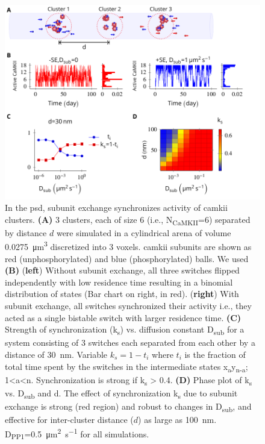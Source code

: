 \documentclass[9pt,lineno,doublespacing]{elife}
\newcommand\SUB[2]{#1\textsubscript{#2}}
\begin{document}
\begin{figure}%
    \includegraphics[width=0.95\linewidth]{./PaperFigures/elifeFigure5/figure_sync_150mm.pdf}
    \caption{In the \gls{psd}, subunit exchange synchronizes activity of
        \gls{camkii} clusters. 
        \textbf{(A)} 3 clusters, each of size 6 (i.e.,
        \SUB{N}{CaMKII}=6) separated by distance \(d\) were simulated in a
        cylindrical arena of volume \SI{0.0275}{\micro\meter^3} discretized
        into 3 voxels. \Gls{camkii} subunits are shown as red 
        (unphosphorylated) and blue (phosphorylated) balls. We used 
        \textbf{(B)} (\textbf{left}) Without subunit exchange, all three
        switches flipped independently with low residence time resulting in a
        binomial distribution of states (Bar chart on right, in red). (\textbf{right})
        With subunit exchange, all switches synchronized their activity i.e.,
        they acted as a single bistable switch with larger residence time.
        \textbf{(C)} Strength of synchronization (\SUB{k}{s})
        vs. diffusion constant \SUB{D}{sub} for a system consisting of 3 switches
        each separated from each other by a distance of \SI{30}{\nano \meter}.
        Variable $k_s=1-t_i$ where $t_i$ is the fraction of total time spent by
        the switches in the intermediate states
        x\textsubscript{a}y\textsubscript{n-a}; 1\textless{}a\textless{}n.
        Synchronization is strong if k\textsubscript{s} \textgreater{} 0.4.
        \textbf{(D)} Phase plot of \SUB{k}{s} vs. \SUB{D}{sub} and d. The effect
        of synchronization \SUB{k}{s} due to subunit exchange is strong (red
        region) and robust to changes in \SUB{D}{sub}, and effective for
        inter-cluster distance ($d$) as large as \SI{100}{\nano\meter}. 
        \SUB{D}{PP1}=\SI{0.5}{\micro\meter\squared\per\second} for all
        simulations.
    }\label{fig:sync_spread}
\end{figure}
\end{document}

